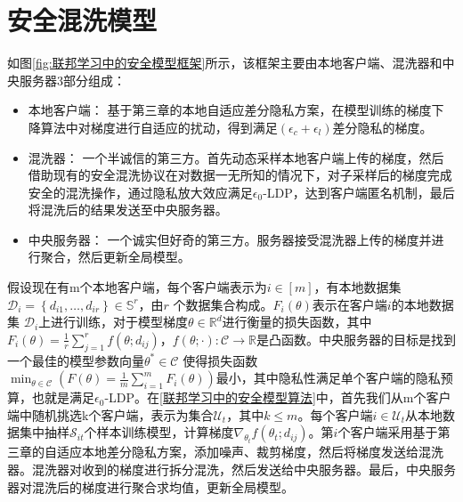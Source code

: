 \section{安全混洗模型}
如图\ref{fig:联邦学习中的安全模型框架}所示，该框架主要由本地客户端、混洗器和中央服务器3部分组成：
\begin{itemize}
  \item 本地客户端： 基于第三章的本地自适应差分隐私方案，在模型训练的梯度下降算法中对梯度进行自适应的扰动，得到满足$\left(\epsilon_{c}+\epsilon_{l}\right)$差分隐私的梯度。
  \item 混洗器： 一个半诚信的第三方。首先动态采样本地客户端上传的梯度，然后借助现有的安全混洗协议在对数据一无所知的情况下，对子采样后的梯度完成安全的混洗操作，通过隐私放大效应满足$\epsilon_{0}$-LDP，达到客户端匿名机制，最后将混洗后的结果发送至中央服务器。
  \item 中央服务器： 一个诚实但好奇的第三方。服务器接受混洗器上传的梯度并进行聚合，然后更新全局模型。
\end{itemize}

假设现在有m个本地客户端，每个客户端表示为$i \in[m]$，有本地数据集\\$\mathcal{D}_{i}=\left\{d_{i 1}, \ldots, d_{i r}\right\} \in \mathbb{S}^{r}$，由$r$ 个数据集合构成。$F_{i}(\theta)$表示在客户端$i$的本地数据集 $\mathcal{D}_{i}$上进行训练，对于模型梯度$\theta \in \mathbb{R}^{d}$进行衡量的损失函数，其中$F_{i}(\theta)=\frac{1}{r} \sum_{j=1}^{r} f\left(\theta ; d_{i j}\right)$，$f(\theta ; \cdot): \mathcal{C} \rightarrow \mathbb{R}$是凸函数。中央服务器的目标是找到一个最佳的模型参数向量$\theta^{*} \in \mathcal{C}$ 使得损失函数$\min _{\theta \in \mathcal{C}}\left(F(\theta)=\frac{1}{m} \sum_{i=1}^{m} F_{i}(\theta)\right)$最小，其中隐私性满足单个客户端的隐私预算，也就是满足$\epsilon_{0}$-LDP。在\ref{联邦学习中的安全模型算法}中，首先我们从m个客户端中随机挑选k个客户端，表示为集合$\mathcal{U}_{t}$，其中$k \leq m$。每个客户端$i \in \mathcal{U}_{t}$从本地数据集中抽样$\mathcal{S}_{i t}$个样本训练模型，计算梯度$\nabla_{\theta_{t}} f\left(\theta_{t} ; d_{i j}\right)$。第$i$个客户端采用基于第三章的自适应本地差分隐私方案，添加噪声、裁剪梯度，然后将梯度发送给混洗器。混洗器对收到的梯度进行拆分混洗，然后发送给中央服务器。最后，中央服务器对混洗后的梯度进行聚合求均值，更新全局模型。

